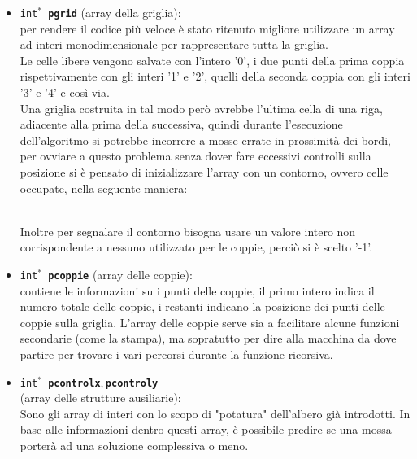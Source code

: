 \documentclass[11pt,a4paper,twocolumn]{IEEEtran}
\newcommand{\mysvg}[2]{}
\newcounter{algoritmo}
\begin{document}
	\begin{itemize}
		\item \texttt{int$^*$ \textbf{pgrid}} (array della griglia):\\ per rendere il codice più veloce è stato ritenuto migliore utilizzare un array ad interi monodimensionale per rappresentare tutta la griglia.\\
		Le celle libere vengono salvate con l'intero '0', i due punti della prima coppia rispettivamente con gli interi '1' e '2', quelli della seconda coppia con gli interi '3' e '4' e così via.\\
		Una griglia costruita in tal modo però avrebbe l'ultima cella di una riga, adiacente alla prima della successiva, quindi durante l'esecuzione dell'algoritmo si potrebbe incorrere a mosse errate in prossimità dei bordi, per ovviare a questo problema senza dover fare eccessivi controlli sulla posizione si è pensato di inizializzare l'array con un contorno, ovvero celle occupate, nella seguente maniera:
		\begin{figure}[h]
			\centering
			\qquad\qquad\quad\text{ }
			\mysvg{pgrid1}{45}
		\end{figure}
	\vspace*{-1.7cm}
			\begin{figure}[h]
		\centering
		\qquad\text{ }
		\mysvg{Downarrow}{04}
	\end{figure}
	\vspace*{-0.7cm}
		\begin{figure}[h]
	\centering
	\text{ }\hspace*{0.6cm}
	\mysvg{pgrid2}{8}
\end{figure}\\
	Inoltre per segnalare il contorno bisogna usare un valore intero non corrispondente a nessuno utilizzato per le coppie, perciò si è scelto '-1'.\\
	
	\item \texttt{int$^*$ \textbf{pcoppie}} (array delle coppie):\\ contiene le informazioni su i punti delle coppie, il primo intero indica il numero totale delle coppie, i restanti indicano la posizione dei punti delle coppie sulla griglia. L'array delle coppie serve sia a facilitare alcune funzioni secondarie (come la stampa), ma sopratutto per dire alla macchina da dove partire per trovare i vari percorsi durante la funzione ricorsiva.\\
	
	\item \texttt{int$^*$ \textbf{pcontrolx}$,$\space\textbf{pcontroly}}\\(array delle strutture ausiliarie):\\
	Sono gli array di interi con lo scopo di "potatura" dell'albero già introdotti. In base alle informazioni dentro questi array, è possibile predire se una mossa porterà ad una soluzione complessiva o meno.\\
	\end{itemize}
\end{document}
